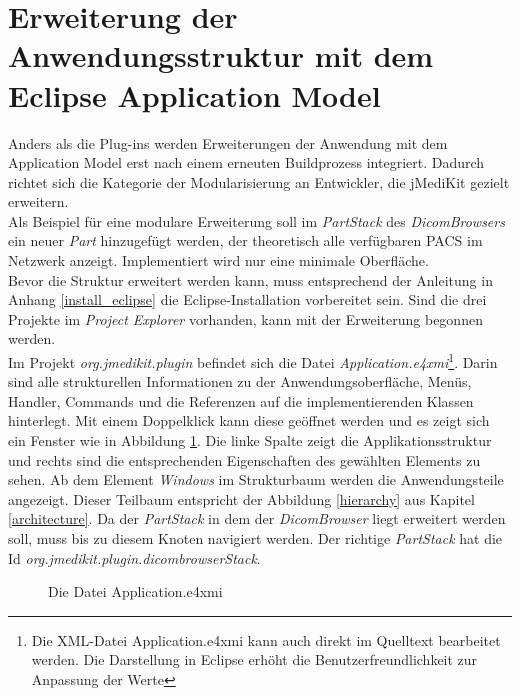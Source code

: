 \section{Erweiterung der Anwendungsstruktur mit dem Eclipse Application Model}
Anders als die Plug-ins werden Erweiterungen der Anwendung mit dem Application Model erst nach einem erneuten Buildprozess integriert. Dadurch richtet sich die Kategorie der Modularisierung an Entwickler, die jMediKit gezielt erweitern.\\
Als Beispiel für eine modulare Erweiterung soll im \textit{PartStack} des \textit{DicomBrowsers} ein neuer \textit{Part} hinzugefügt werden, der theoretisch alle verfügbaren PACS im Netzwerk anzeigt. Implementiert wird nur eine minimale Oberfläche.\\
Bevor die Struktur erweitert werden kann, muss entsprechend der Anleitung in Anhang \ref{install_eclipse} die Eclipse-Installation vorbereitet sein. Sind die drei Projekte im \textit{Project Explorer} vorhanden, kann mit der Erweiterung begonnen werden.\\
Im Projekt \textit{org.jmedikit.plugin} befindet sich die Datei \textit{Application.e4xmi}\footnote{Die XML-Datei Application.e4xmi kann auch direkt im Quelltext bearbeitet werden. Die Darstellung in Eclipse erhöht die Benutzerfreundlichkeit zur Anpassung der Werte}. Darin sind alle strukturellen Informationen zu der Anwendungsoberfläche, Menüs, Handler, Com\-mands und die Referenzen auf die implementierenden Klassen hinterlegt. Mit einem Doppelklick kann diese geöffnet werden und es zeigt sich ein Fenster wie in Abbildung \ref{e4xmi}. Die linke Spalte zeigt die Applikationsstruktur und rechts sind die entsprechenden Eigenschaften des gewählten Elements zu sehen. Ab dem Element \textit{Windows} im Strukturbaum werden die Anwendungsteile angezeigt. Dieser Teilbaum entspricht der Abbildung \ref{hierarchy} aus Kapitel \ref{architecture}. Da der \textit{PartStack} in dem der \textit{DicomBrowser} liegt erweitert werden soll, muss bis zu diesem Knoten navigiert werden. Der richtige \textit{PartStack} hat die Id \textit{org.jmedikit.plugin.dicombrowserStack}.
\begin{figure}[H]
  \vspace{0.5cm}
  \centering
   \caption{Die Datei Application.e4xmi}
  \label{e4xmi}
  \vspace{0.5cm}
\end{figure}

